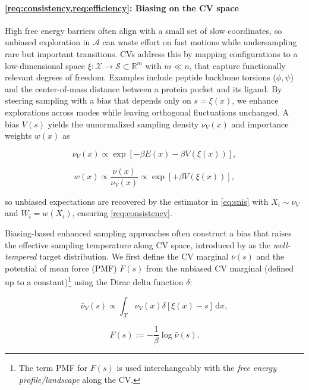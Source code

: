 \documentclass[]{fairmeta}
\theoremstyle{remark}
\begin{document}
\paragraph{\cref{req:consistency,req:efficiency}: Biasing on the CV space}
High free energy barriers often align with a small set of slow coordinates, so unbiased exploration in $\mathcal{A}$ can waste effort on fast motions while undersampling rare but important transitions.
CVs address this by mapping configurations to a low-dimensional space $\xi: \mathcal{X} \to \mathcal{S} \subset \mathbb{R}^m$ with $m \ll n$, that capture functionally relevant degrees of freedom.
Examples include peptide backbone torsions ($\phi, \psi$) and the center-of-mass distance between a protein pocket and its ligand.
By steering sampling with a bias that depends only on $s = \xi(x)$, we enhance explorations across modes while leaving orthogonal fluctuations unchanged.
A bias $V(s)$ yields the unnormalized sampling density $\nu_V(x)$ and importance weights $w(x)$ as

\begin{minipage}{.5\linewidth}
\begin{equation}
\nu_V(x) \propto \exp[-\beta E(x) - \beta V(\xi(x))],
\label{eq:bias_density}
\end{equation}
\end{minipage}%
\begin{minipage}{.5\linewidth}
\begin{equation}
w(x) \propto \frac{\nu(x)}{\nu_V(x)} \propto \exp[+\beta V(\xi(x))],
\label{eq:is_weight}
\end{equation}
\end{minipage}

so unbiased expectations are recovered by the estimator in \cref{eq:snis} with $X_i \sim \nu_V$ and $W_i = w(X_i)$, ensuring \cref{req:consistency}.

Biasing-based enhanced sampling approaches often construct a bias that raises the effective sampling temperature along CV space, introduced by \citet{barducci2008well} as the \textit{well-tempered} target distribution.
We first define the CV marginal $\bar{\nu}(s)$ and the potential of mean force (PMF) $F(s)$ from the unbiased CV marginal (defined up to a constant)\footnote{The term PMF for $F(s)$ is used interchangeably with the \textit{free energy profile/landscape} along the CV.} using the Dirac delta function $\delta$:

\begin{minipage}{.5\linewidth}
\begin{equation}
\bar{\nu}_V(s) \propto \int_\mathcal{X} \nu_V(x) \delta[\xi(x)-s] \, \mathrm{d}x,
\label{eq:cv_marginal}
\end{equation}
\end{minipage}%
\begin{minipage}{.5\linewidth}
\begin{equation}
F(s) := -\frac{1}{\beta} \log \bar{\nu}(s).
\label{eq:pmf}
\end{equation}
\end{minipage}
\end{document}
